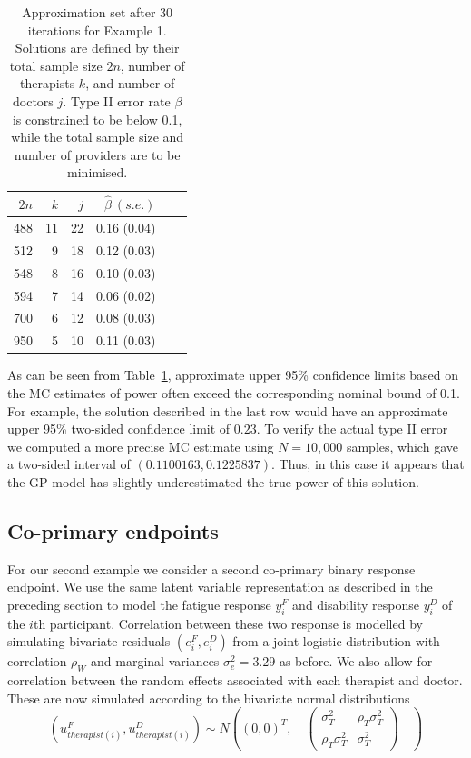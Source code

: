\documentclass{article} %
\begin{document}
\begin{table}
\caption{Approximation set after 30 iterations for Example 1. Solutions are defined by their total sample size $2n$, number of therapists $k$, and number of doctors $j$. Type II error rate $\beta$ is constrained to be below 0.1, while the total sample size and number of providers are to be minimised.}
\centering
\begin{tabular}{rrrrrr}
\toprule
$2n$ & $k$ & $j$ & $\hat{\beta}~(s.e.)$ \\ 
\midrule
488 & 11 & 22 & 0.16 (0.04) \\ 
512 & 9 & 18 & 0.12 (0.03) \\
548 & 8 & 16 & 0.10 (0.03) \\
594 & 7 & 14 & 0.06 (0.02) \\
700 & 6 & 12 & 0.08 (0.03) \\
950 & 5 & 10 & 0.11 (0.03) \\
\bottomrule
\end{tabular}
\label{tab:ex1_single_run}
\end{table}

As can be seen from Table~\ref{tab:ex1_single_run}, approximate upper 95\% confidence limits based on the MC estimates of power often exceed the corresponding nominal bound of 0.1. For example, the solution described in the last row would have an approximate upper 95\% two-sided confidence limit of $0.23$. To verify the actual type II error  we computed a more precise MC estimate using $N = 10,000$ samples, which gave a two-sided interval of $(0.1100163, 0.1225837)$. Thus, in this case it appears that the GP model has slightly underestimated the true power of this solution.


\subsection{Co-primary endpoints}

For our second example we consider a second co-primary binary response endpoint. We use the same latent variable representation as described in the preceding section to model the fatigue response $y_i^F$ and disability response $y_i^D$ of the $i$th participant. Correlation between these two response is modelled by simulating bivariate residuals $(e_i^F, e_i^D)$ from a joint logistic distribution with correlation $\rho_W$ and marginal variances $\sigma_e^2 = 3.29$ as before. We also allow for correlation between the random effects associated with each therapist and doctor. These are now simulated according to the bivariate normal distributions
$$
(u_{therapist(i)}^F, u_{therapist(i)}^D) \sim N\left( (0,0)^T, \quad
\begin{pmatrix} 
\sigma_T^2 & \rho_T \sigma_T^2 \\
\rho_T \sigma_T^2  & \sigma_T^2 
\end{pmatrix}
\quad \right)
$$
\end{document}

